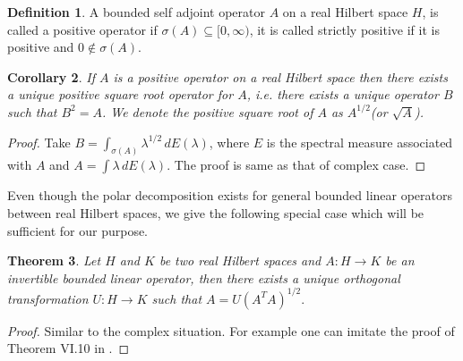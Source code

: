 \documentclass[12pt,a4paper,twoside]{article}
\numberwithin{equation}{section}
\theoremstyle{definition}  %
\newtheorem{defn}{Definition}[section]
\theoremstyle{plain}  %
\newtheorem{thm}[defn]{Theorem}
\newtheorem{cor}[defn]{Corollary}
\theoremstyle{remark} %
\begin{document}
\begin{defn}
  A bounded self adjoint operator $A$ on a real Hilbert space $H$, is called a positive operator if $\sigma(A) \subseteq [0, \infty)$, it is called strictly positive if it is positive and $0 \notin \sigma(A)$.
\end{defn}
\begin{cor}\label{cor:sqr-rt}
  If $A$ is a positive operator on a real Hilbert space then there exists a unique positive square root operator for $A$, i.e. there exists a unique operator $B$ such that $B^{2}= A$. We denote the positive square root of $A$ as $A^{1/2}$(or $\sqrt{A}$).
\end{cor}
\begin{proof}
  Take $B= \int_{\sigma(A)}\lambda^{1/2} \,dE(\lambda)$, where $E$ is the spectral measure associated with $A$ and $A= \int \lambda \,dE(\lambda)$. The proof is same as that of complex case.
\end{proof}
Even though the polar decomposition exists for general bounded linear operators between real Hilbert spaces, we give the following special case which will be sufficient for our purpose.
\begin{thm}
  Let $H$ and $K$ be two real Hilbert spaces and $A \colon H \rightarrow K$ be an invertible bounded linear operator, then there exists a unique orthogonal transformation $U \colon H \rightarrow K$ such that $A= U(A^{T}A)^{1/2}.$
\end{thm}
\begin{proof}
  Similar to the complex situation. For example one can imitate the proof of Theorem VI.10 in \cite{ReS80}.
\end{proof}
\end{document}
